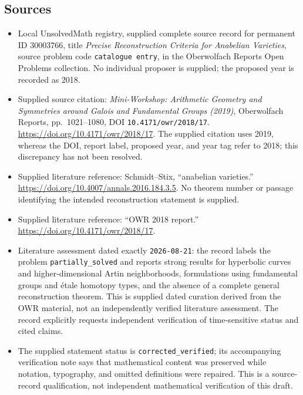 \documentclass[11pt]{article}
\begin{document}
\subsection{Sources}
\begin{itemize}
\item Local UnsolvedMath registry, supplied complete source record for permanent ID \(30003766\), title \emph{Precise Reconstruction Criteria for Anabelian Varieties}, source problem code \texttt{catalogue entry}, in the Oberwolfach Reports Open Problems collection. No individual proposer is supplied; the proposed year is recorded as 2018.
\item Supplied source citation: \emph{Mini-Workshop: Arithmetic Geometry and Symmetries around Galois and Fundamental Groups (2019)}, Oberwolfach Reports, pp.\ 1021--1080, DOI \texttt{10.4171/owr/2018/17}. \url{https://doi.org/10.4171/owr/2018/17}. The supplied citation uses 2019, whereas the DOI, report label, proposed year, and year tag refer to 2018; this discrepancy has not been resolved.
\item Supplied literature reference: Schmidt--Stix, ``anabelian varieties.'' \url{https://doi.org/10.4007/annals.2016.184.3.5}. No theorem number or passage identifying the intended reconstruction statement is supplied.
\item Supplied literature reference: ``OWR 2018 report.'' \url{https://doi.org/10.4171/owr/2018/17}.
\item Literature assessment dated exactly \texttt{2026-08-21}: the record labels the problem \texttt{partially\_solved} and reports strong results for hyperbolic curves and higher-dimensional Artin neighborhoods, formulations using fundamental groups and étale homotopy types, and the absence of a complete general reconstruction theorem. This is supplied dated curation derived from the OWR material, not an independently verified literature assessment. The record explicitly requests independent verification of time-sensitive status and cited claims.
\item The supplied statement status is \texttt{corrected\_verified}; its accompanying verification note says that mathematical content was preserved while notation, typography, and omitted definitions were repaired. This is a source-record qualification, not independent mathematical verification of this draft.
\end{itemize}
\end{document}
